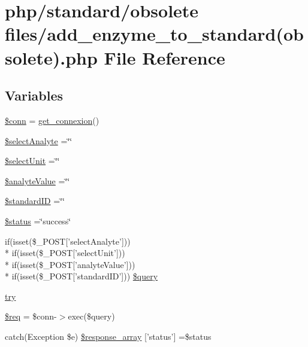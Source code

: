 \hypertarget{add__enzyme__to__standard_07obsolete_08_8php}{\section{php/standard/obsolete files/add\-\_\-enzyme\-\_\-to\-\_\-standard(obsolete).php File Reference}
\label{add__enzyme__to__standard_07obsolete_08_8php}
}
\subsection*{Variables}
\begin{DoxyCompactItemize}
\item 
\hyperlink{add__enzyme__to__standard_07obsolete_08_8php_aa8a5a87b9c1a6a0819b88447cbe41877}{\$conn} = \hyperlink{php__functions_8php_ace18bc10f3fd08f92688ac743e0d8c2e}{get\-\_\-connexion}()
\item 
\hyperlink{add__enzyme__to__standard_07obsolete_08_8php_ae5b99d173d7360be6556675a80036269}{\$select\-Analyte} =\char`\"{}\char`\"{}
\item 
\hyperlink{add__enzyme__to__standard_07obsolete_08_8php_a427fdcd2d971a5567fb4d111d8de5f54}{\$select\-Unit} =\char`\"{}\char`\"{}
\item 
\hyperlink{add__enzyme__to__standard_07obsolete_08_8php_aa0668b8f5734a61bcc5107303a90615a}{\$analyte\-Value} =\char`\"{}\char`\"{}
\item 
\hyperlink{add__enzyme__to__standard_07obsolete_08_8php_a0c541a369e4a0434108a7d145751bb23}{\$standard\-I\-D} =\char`\"{}\char`\"{}
\item 
\hyperlink{add__enzyme__to__standard_07obsolete_08_8php_a58391ea75f2d29d5d708d7050b641c33}{\$status} =\char`\"{}success\char`\"{}
\item 
if(isset(\$\-\_\-\-P\-O\-S\-T\mbox{[}'select\-Analyte'\mbox{]})) \\*
if(isset(\$\-\_\-\-P\-O\-S\-T\mbox{[}'select\-Unit'\mbox{]})) \\*
if(isset(\$\-\_\-\-P\-O\-S\-T\mbox{[}'analyte\-Value'\mbox{]})) \\*
if(isset(\$\-\_\-\-P\-O\-S\-T\mbox{[}'standard\-I\-D'\mbox{]})) \hyperlink{add__enzyme__to__standard_07obsolete_08_8php_af80a389c803b49e5cf248f32c14147c9}{\$query}
\item 
\hyperlink{add__enzyme__to__standard_07obsolete_08_8php_abe4cc9788f52e49485473dc699537388}{try}
\item 
\hyperlink{add__enzyme__to__standard_07obsolete_08_8php_a63a7a283ea5dee8af1e2d5a3435bf370}{\$req} = \$conn-\/$>$exec(\$query)
\item 
catch(Exception \$e) \hyperlink{add__enzyme__to__standard_07obsolete_08_8php_a8452fb8131316637a04e25f5fde066d9}{\$response\-\_\-array} \mbox{[}'status'\mbox{]} =\$status
\end{DoxyCompactItemize}


